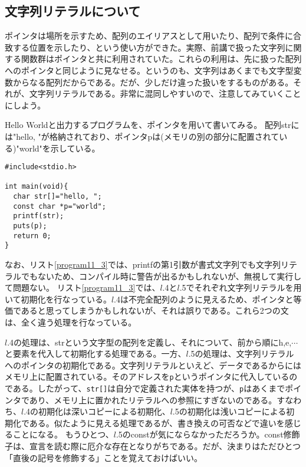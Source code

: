 \subsection{文字列リテラルについて}
ポインタは場所を示すため、配列のエイリアスとして用いたり、配列で条件に合致する位置を示したり、という使い方ができた。実際、前講で扱った文字列に関する関数群はポインタと共に利用されていた。これらの利用は、先に扱った配列へのポインタと同じように見なせる。というのも、文字列はあくまでも文字型変数からなる配列だからである。だが、少しだけ違った扱いをするものがある。それが、文字列リテラルである。非常に混同しやすいので、注意してみていくことにしよう。
\begin{boxnote}
\begin{multicols}{2}
Hello Worldと出力するプログラムを、ポインタを用いて書いてみる。
配列strには"hello, "が格納されており、ポインタpは(メモリの別の部分に配置されている)"world"を示している。
\begin{lstlisting}[caption=Hello World(3回目),label=program11_3]
#include<stdio.h>

int main(void){
  char str[]="hello, ";
  const char *p="world";
  printf(str);
  puts(p);
  return 0;
}
\end{lstlisting}
\end{multicols}
\end{boxnote}
なお、リスト\ref{program11_3}では、printfの第1引数が書式文字列でも文字列リテラルでもないため、コンパイル時に警告が出るかもしれないが、無視して実行して問題ない。
リスト\ref{program11_3}では、$l$.4と$l$.5でそれぞれ文字列リテラルを用いて初期化を行なっている。$l$.4は不完全配列のように見えるため、ポインタと等価であると思ってしまうかもしれないが、それは誤りである。これら2つの文は、全く違う処理を行なっている。

$l$.4の処理は、strという文字型の配列を定義し、それについて、前から順にh,e,$\cdots$と要素を代入して初期化する処理である。一方、$l$.5の処理は、文字列リテラルへのポインタの初期化である。文字列リテラルといえど、データであるからにはメモリ上に配置されている。そのアドレスを\verb|p|というポインタに代入しているのである。したがって、\verb|str[]|は自分で定義された実体を持つが、\verb|p|はあくまでポインタであり、メモリ上に置かれたリテラルへの参照にすぎないのである。すなわち、$l$.4の初期化は深いコピーによる初期化、$l$.5の初期化は浅いコピーによる初期化である。似たように見える処理であるが、書き換えの可否などで違いを感じることになる。
もうひとつ、$l$.5のconstが気にならなかっただろうか。const修飾子は、宣言を読む際に厄介な存在となりがちである。だが、決まりはただひとつ「直後の記号を修飾する」ことを覚えておけばいい。

